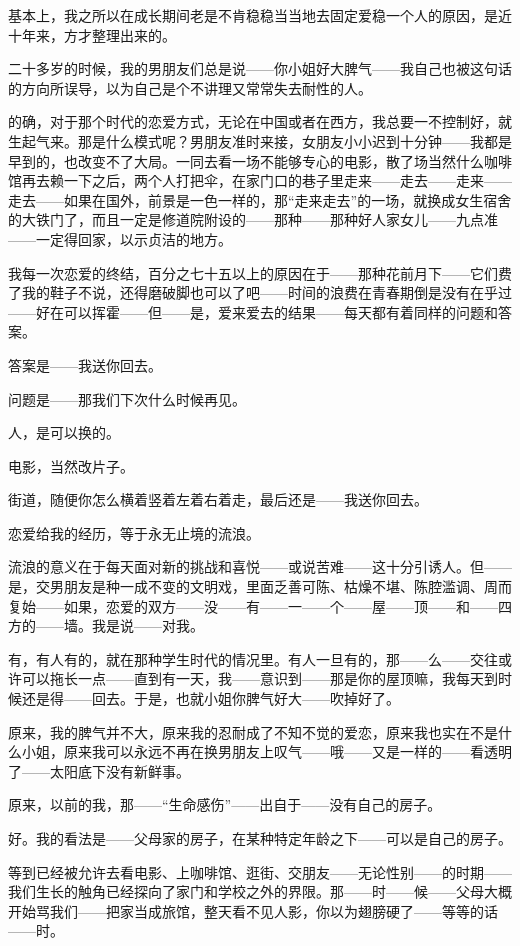 \par 基本上，我之所以在成长期间老是不肯稳稳当当地去固定爱稳一个人的原因，是近十年来，方才整理出来的。
\par 二十多岁的时候，我的男朋友们总是说——你小姐好大脾气——我自己也被这句话的方向所误导，以为自己是个不讲理又常常失去耐性的人。
\par 的确，对于那个时代的恋爱方式，无论在中国或者在西方，我总要一不控制好，就生起气来。那是什么模式呢？男朋友准时来接，女朋友小小迟到十分钟——我都是早到的，也改变不了大局。一同去看一场不能够专心的电影，散了场当然什么咖啡馆再去赖一下之后，两个人打把伞，在家门口的巷子里走来——走去——走来——走去——如果在国外，前景是一色一样的，那“走来走去”的一场，就换成女生宿舍的大铁门了，而且一定是修道院附设的——那种——那种好人家女儿——九点准——一定得回家，以示贞洁的地方。
\par 我每一次恋爱的终结，百分之七十五以上的原因在于——那种花前月下——它们费了我的鞋子不说，还得磨破脚也可以了吧——时间的浪费在青春期倒是没有在乎过——好在可以挥霍——但——是，爱来爱去的结果——每天都有着同样的问题和答案。
\par 答案是——我送你回去。
\par 问题是——那我们下次什么时候再见。
\par 人，是可以换的。
\par 电影，当然改片子。
\par 街道，随便你怎么横着竖着左着右着走，最后还是——我送你回去。
\par 恋爱给我的经历，等于永无止境的流浪。
\par 流浪的意义在于每天面对新的挑战和喜悦——或说苦难——这十分引诱人。但——是，交男朋友是种一成不变的文明戏，里面乏善可陈、枯燥不堪、陈腔滥调、周而复始——如果，恋爱的双方——没——有——一——个——屋——顶——和——四方的——墙。我是说——对我。
\par 有，有人有的，就在那种学生时代的情况里。有人一旦有的，那——么——交往或许可以拖长一点——直到有一天，我——意识到——那是你的屋顶嘛，我每天到时候还是得——回去。于是，也就小姐你脾气好大——吹掉好了。
\par 原来，我的脾气并不大，原来我的忍耐成了不知不觉的爱恋，原来我也实在不是什么小姐，原来我可以永远不再在换男朋友上叹气——哦——又是一样的——看透明了——太阳底下没有新鲜事。
\par 原来，以前的我，那——“生命感伤”——出自于——没有自己的房子。
\par 好。我的看法是——父母家的房子，在某种特定年龄之下——可以是自己的房子。
\par 等到已经被允许去看电影、上咖啡馆、逛街、交朋友——无论性别——的时期——我们生长的触角已经探向了家门和学校之外的界限。那——时——候——父母大概开始骂我们——把家当成旅馆，整天看不见人影，你以为翅膀硬了——等等的话——时。
